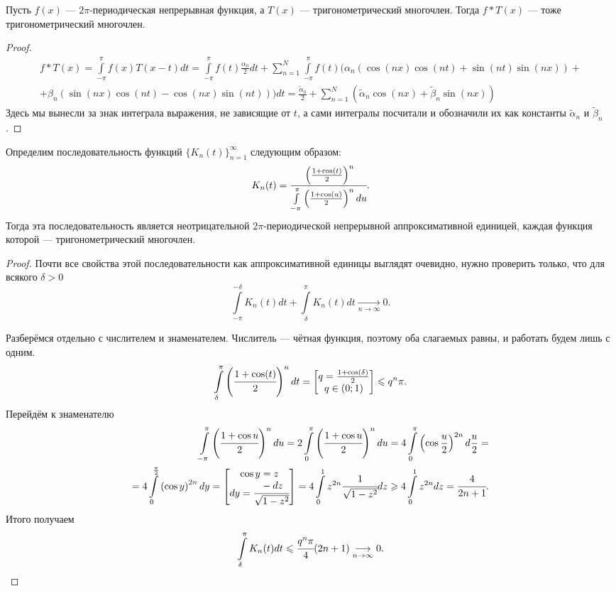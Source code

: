 \begin{Lemma}
	Пусть $f(x)$ --- $2\pi$-периодическая непрерывная функция, а $T(x)$ --- тригонометрический многочлен. Тогда $f*T(x)$ --- тоже тригонометрический многочлен.
\end{Lemma}
\begin{proof}
	\begin{align*}
	f*T(x) = \int \limits_{-\pi}^{\pi}f(x)T(x - t)dt = \int \limits_{-\pi}^{\pi}f(t)\frac{\alpha_0}{2}dt +\sum\limits_{n=1}^{N} \int \limits_{-\pi}^{\pi}f(t)(\alpha_n(\cos(nx)\cos(nt) + \sin(nt)\sin(nx)) +\\+ \beta_n(\sin(nx)\cos(nt) - \cos(nx)\sin(nt)))dt = \frac{\widetilde{\alpha}_0}{2} + \sum \limits_{n=1}^{N}\left(\widetilde{\alpha}_n\cos(nx) + \widetilde{\beta}_n\sin(nx)\right)
	\end{align*}
	Здесь мы вынесли за знак интеграла выражения, не зависящие от $t$, а сами интегралы посчитали и обозначили их как константы $\widetilde{\alpha}_n$ и $\widetilde{\beta}_n$.
\end{proof}
\begin{Lemma}
	Определим последовательность функций $\{K_n(t)\}_{n=1}^{\infty}$ следующим образом:
	$$
		K_n(t) = \cfrac{\left(\frac{1+\cos(t)}{2}\right)^n}{\int\limits_{-\pi}^{\pi} \left(\frac{1 + \cos(u)}{2}\right)^ndu}.
	$$
	Тогда эта последовательность является неотрицательной $2\pi$-периодической непрерывной аппроксимативной единицей, каждая функция которой --- тригонометрический многочлен. 
\end{Lemma}
\begin{proof}
    Почти все свойства этой последовательности как аппроксимативной единицы выглядят очевидно, нужно проверить только, что для всякого $\delta > 0$
	$$
		\int\limits_{-\pi}^{-\delta}K_n(t) dt + \int\limits_{\delta}^{\pi}K_n(t) dt \underset{n\to \infty}{\longrightarrow} 0.
	$$

Разберёмся отдельно с числителем и знаменателем.
Числитель --- чётная функция, поэтому оба слагаемых равны, и работать будем лишь с одним.
$$
	\int\limits_{\delta}^{\pi}\left(\cfrac{1 + \cos(t)}{2}\right)^n dt = \begin{bmatrix} q = \frac{1 + \cos(\delta)}{2}\\
	q \in (0;1)
	\end{bmatrix} \leqslant q^n\pi.
$$
Перейдём к знаменателю
\begin{align*}
	\int\limits_{-\pi}^{\pi} \left(\cfrac{1 + \cos u}{2}\right)^n du = 2\int\limits_{0}^{\pi} \left(\cfrac{1 + \cos u}{2}\right)^n du = 4 \int\limits_{0}^{\pi} \left(\cos\frac{u}{2}\right)^{2n} d\frac{u}{2} = \\ =
	4 \int\limits_{0}^{\frac{\pi}{2}} \left(\cos y\right)^{2n} dy = \begin{bmatrix}
		\cos y = z\\
		dy = \cfrac{-dz}{\sqrt{1 - z^2}}
		\end{bmatrix} = 4 \int\limits_{0}^{1} z^{2n} \cfrac{1}{\sqrt{1-z^2}}dz \geqslant 4\int\limits_{0}^{1} z^{2n}dz = \cfrac{4}{2n+1}.
\end{align*}
Итого получаем
$$
	\int\limits_{\delta}^{\pi}K_n(t) dt \leqslant \cfrac{q^n\pi}{4}(2n+1) \underset{n \to \infty}{\longrightarrow} 0.
$$
\end{proof}
